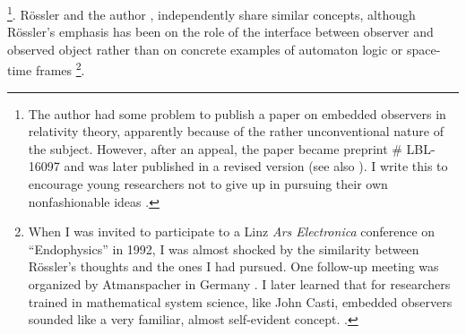 \documentclass[pre,preprint,showpacs,showkeys,amsfonts]{revtex4}
\begin{document}
\footnote{
The author had some problem to publish a paper on embedded observers in
relativity theory, apparently because of the rather unconventional nature of
the subject.  However, after an appeal, the paper became preprint \#
LBL-16097 \cite{svo-83} and was later published in a revised version \cite{svo5} (see also
\cite{svo-86}).  I write this to encourage young researchers not to give up in
pursuing their own nonfashionable ideas  \cite{dyson-unfash}.
}.
R\"ossler  \cite{roessler-87,roessler-92} and the author
\cite{svo-83,svo5,svo-86,svozil-94,svozil-93}, independently
share similar concepts,
although R\"ossler's emphasis has been on the
role of the interface between observer and observed object
\cite{roessler-98}
rather than on concrete examples of automaton logic or space-time frames
\footnote{
When I was invited to participate to a Linz {\it Ars Electronica}
 conference on ``Endophysics'' in 1992,
I was almost shocked by the similarity between
R\"ossler's thoughts and the ones I had pursued.
One follow-up meeting was organized by Atmanspacher in Germany \cite{atman:93}.
I later learned that for researchers trained in mathematical system science,
like John Casti, embedded observers sounded like a very familiar, almost self-evident concept.
\cite{casti:90,casti:92,casti:92b}.
}.
\end{document}
